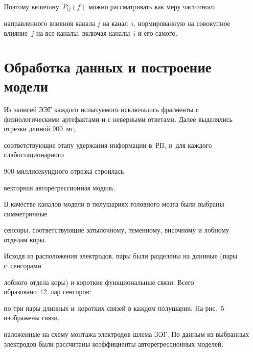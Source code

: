 Поэтому величину~$P_{ij}(f)$  можно рассматривать как меру частотного


направленного влияния канала $j$ на канал~$i$, нормированную на совокупное влияние~$j$ на все каналы, включая каналы~$i$ и его самого.








\section{Обработка данных и построение модели}





Из записей ЭЭГ каждого испытуемого исключались фрагменты с физиологическими артефактами и с неверными ответами. Далее выделялись отрезки длиной 900~мс,


соответствующие этапу удержания информации в~РП, и~для каждого слабостационарного 


900-мил\-ли\-се\-кунд\-но\-го отрезка строилась


векторная авторегрессионная модель.





В качестве каналов модели в полушариях головного мозга были выбраны симметричные


сенсоры, соответствующие затылочному, теменному, височному и лобному отделам коры.


Исходя из расположения электродов, пары были разделены на длинные (пары с~сенсорами 


лобного отдела коры) и короткие функциональные связи. Всего образовано~12~пар сенсоров: 


по три пары длинных и~коротких связей в каждом полушарии. На рис.~5 изображены связи,


наложенные на схему монтажа электродов шлема ЭЭГ. По данным из выбранных электродов были рассчитаны коэффициенты авторегрессионных моделей.





